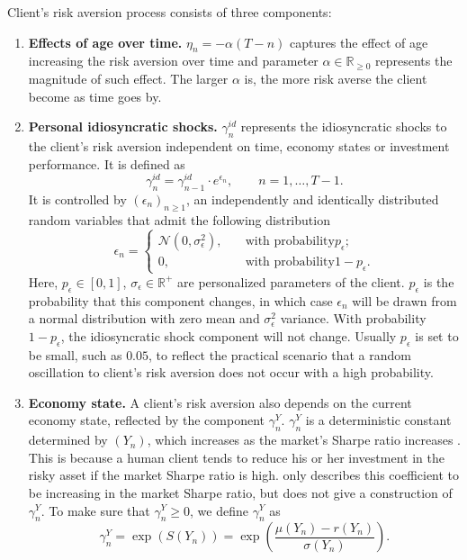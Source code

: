 Client's risk aversion process consists of three components:\begin{enumerate}
    \item \textbf{Effects of age over time.} $\eta_n=-\alpha(T-n)$ captures the effect of age increasing the risk aversion over time and parameter $\alpha\in\mathbb{R}_{\geq0}$ represents the magnitude of such effect. The larger $\alpha$ is, the more risk averse the client become as time goes by.
    \item \textbf{Personal idiosyncratic shocks.} $\gamma_n^{id}$ represents the idiosyncratic shocks to the client’s risk aversion independent on time, economy states or investment performance. It is defined as\begin{equation}\label{eq:gamma_id}
        \gamma_{n}^{id}=\gamma_{n-1}^{id}\cdot e^{\epsilon_{n}},\qquad n=1,\ldots,T-1.
    \end{equation}It is controlled by $(\epsilon_n)_{n\geq1}$, an independently and identically distributed random variables that admit the following distribution \begin{equation}\label{eq:eps}
        \epsilon_n=\begin{cases}
            \mathcal{N}(0,\sigma^2_\epsilon),\quad &\text{with probability} p_\epsilon;\\
            0,\quad&\text{with probability} 1-p_\epsilon.
        \end{cases}
    \end{equation}
    Here, $p_\epsilon\in[0,1]$, $\sigma_\epsilon\in\mathbb{R}^+$ are personalized parameters of the client. $p_\epsilon$ is the probability that this component changes, in which case $\epsilon_n$ will be drawn from a normal distribution with zero mean and $\sigma_\epsilon^2$ variance. With probability $1-p_\epsilon$, the idiosyncratic shock component will not change. Usually $p_\epsilon$ is set to be small, such as $0.05$, to reflect the practical scenario that a random oscillation to client's risk aversion does not occur with a high probability. 
    \item \textbf{Economy state.} A client's risk aversion also depends on the current economy state, reflected by the component $\gamma_n^Y$. $\gamma_n^Y$ is a deterministic constant determined by $(Y_n)$, which increases as the market's Sharpe ratio increases \cite{lettau2010measuring}. This is because a human client tends to reduce his or her investment in the risky asset if the market Sharpe ratio is high.  only describes this coefficient to be increasing in the market Sharpe ratio, but does not give a construction of $\gamma_n^Y$. To make sure that $\gamma_n^Y\geq0$, we define $\gamma_n^Y$ as \begin{equation}\label{eq:gamma_y}
        \gamma_n^Y=\exp(S(Y_n))=\exp{\left(\frac{\mu(Y_n)-r(Y_n)}{\sigma(Y_n)}\right)}.
    \end{equation}
\end{enumerate}

